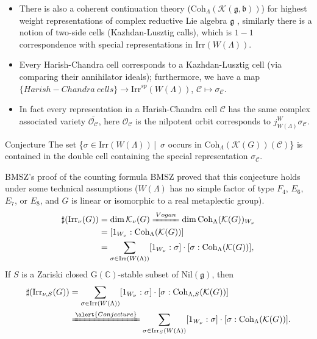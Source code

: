 \documentclass[fleqn,xcolor=dvipsnames]{beamer}
\newcommand{\BC}{{\mathbb {C}}}
\newcommand{\CC}{{\mathcal {C}}}
\newcommand{\CK}{{\mathcal {K}}}
\newcommand{\CO}{{\mathcal {O}}}
\newcommand{\RG}{{\mathrm {G}}}
\newcommand{\fb}{\mathfrak{b}}
\newcommand{\fg}{\mathfrak{g}}
\newcommand{\Irr}{{\mathrm{Irr}}}
\newcommand{\Nil}{{\mathrm{Nil}}}
\newcommand{\set}[2]{\{#1\,|\,#2\}}
\renewcommand{\bar}{\overline}
\begin{document}
\begin{frame}
\begin{itemize}
  \item There is also a coherent continuation theory ($\mathrm{Coh}_{\Lambda}(\CK(\fg,\fb))$) for \alert{highest weight representations} of complex reductive Lie algebra $\fg$ , similarly there is a notion of  \alert{two-side cells} (Kazhdan-Lusztig calls), which is $1-1$ correspondence with special representations in $\Irr(W(\Lambda))$.
  \item Every Harish-Chandra cell corresponds to a Kazhdan-Lusztig cell (via comparing their annihilator ideals); furthermore, we have a map $\{Harish-Chandra \ cells\} \to \Irr^{sp}(W(\Lambda))$, $\CC \mapsto \sigma_{\CC}$.
  \item In fact every representation in a Harish-Chandra cell $\CC$ has the \alert{same complex associated variety} $\bar{\CO_{\CC}}$, here $\CO_{\CC}$ is the nilpotent orbit corresponds to $j_{W(\Lambda)}^{W}\sigma_{\CC}$.
\end{itemize}


  \begin{block}{Conjecture}
    The set \set{$\sigma \in \Irr(W(\Lambda))$}{ \textrm{$\sigma$ occurs in $\mathrm{Coh}_{\Lambda}(\CK(G))(\CC)$}} is contained in the double cell containing the special representation $\sigma_{\CC}$.
  \end{block}

  
\end{frame}




\begin{frame}{BMSZ's proof of the counting formula}
  BMSZ proved that this conjecture holds under some technical assumptions ($W(\Lambda)$ has no simple factor of type $F_4$, $E_6$, $E_7$, or $E_8$, and $G$ is linear or isomorphic to a real metaplectic group).
  \pause\begin{align*}
    \sharp(\Irr_{\nu}(G)) &= \dim \CK_{\nu}(G) \xlongequal{Vogan} \dim \mathrm{Coh}_{\Lambda}(\CK(G))_{W_\nu} \\
    & = [1_{W_{\nu}}:\mathrm{Coh}_{\Lambda}(\CK(G))] \\
    & = \sum_{\sigma \in \Irr(W(\Lambda))} [1_{W_\nu}:\sigma] \cdot [\sigma:\mathrm{Coh}_{\Lambda}(\CK(G))],
  \end{align*}
  \pause If $S$ is a Zariski closed $\RG(\BC)$-stable subset of $\Nil(\fg)$, then
  \begin{align*}
    \sharp(\Irr_{\nu,S}(G)) & = \sum_{\sigma \in \Irr(W(\Lambda))} [1_{W_\nu}:\sigma] \cdot [\sigma:\mathrm{Coh}_{\Lambda,S}(\CK(G))]\\
    & \xlongequal{\alert{Conjecture}} \sum_{\sigma \in \Irr_{S}(W(\Lambda))} [1_{W_\nu}:\sigma] \cdot [\sigma:\mathrm{Coh}_{\Lambda}(\CK(G))].
  \end{align*}
\end{frame}
\end{document}
